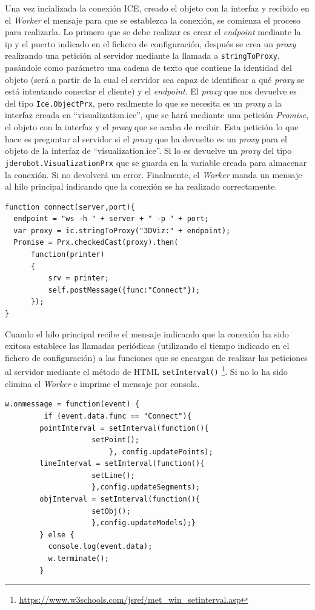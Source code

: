 Una vez incializada la conexión ICE, creado el objeto con la interfaz y recibido en el \textit{Worker} el mensaje para que se establezca la conexión, se comienza el proceso para realizarla. Lo primero que se debe realizar es crear el \textit{endpoint} mediante la ip y el puerto indicado en el fichero de configuración, después se crea un \textit{proxy} realizando una petición al servidor mediante la llamada a \texttt{stringToProxy}, pasándole como parámetro una cadena de texto que contiene la identidad del objeto (será a partir de la cual el servidor sea capaz de identificar a qué \textit{proxy} se está intentando conectar el cliente) y el \textit{endpoint}. El \textit{proxy} que nos devuelve es del tipo \texttt{Ice.ObjectPrx}, pero realmente lo que se necesita es un \textit{proxy} a la interfaz creada en ``visualization.ice'', que se hará mediante una petición \textit{Promise}, el objeto con la interfaz y el \textit{proxy} que se acaba de recibir. Esta petición lo que hace es preguntar al servidor si el \textit{proxy} que ha devuelto es un \textit{proxy} para el objeto de la interfaz de ``visualization.ice''. Si lo es devuelve un \textit{proxy} del tipo \texttt{jderobot.VisualizationPrx} que se guarda en la variable creada para almacenar la conexión. Si no devolverá un error.  Finalmente, el \textit{Worker} manda un mensaje al hilo principal indicando que la conexión se ha realizado correctamente.

\begin{lstlisting}[caption= Código para realizar la conexión ICE, label=cod.conexionice]
function connect(server,port){
  endpoint = "ws -h " + server + " -p " + port;
  var proxy = ic.stringToProxy("3DViz:" + endpoint);
  Promise = Prx.checkedCast(proxy).then(
      function(printer)
      {
          srv = printer;
          self.postMessage({func:"Connect"});
      });
}
\end{lstlisting}

Cuando el hilo principal recibe el mensaje indicando que la conexión ha sido exitosa establece las llamadas periódicas (utilizando el tiempo indicado en el fichero de configuración) a las funciones que se encargan de realizar las peticiones al servidor mediante el método de HTML \texttt{setInterval()} \footnote{\url{https://www.w3schools.com/jsref/met_win_setinterval.asp}}. Si no lo ha sido elimina el \textit{Worker} e imprime el mensaje por consola. 

\begin{lstlisting}[caption= Código para crear las llamadas periódicas a las funciones encargadas de realizar las peticiones al servidor, label=cod.funcionesinterval]
w.onmessage = function(event) {
      	 if (event.data.func == "Connect"){
		pointInterval = setInterval(function(){
					setPoint();
						}, config.updatePoints);
		lineInterval = setInterval(function(){
					setLine();
					},config.updateSegments);
		objInterval = setInterval(function(){
					setObj();
					},config.updateModels);}	
        } else {
          console.log(event.data);
          w.terminate();
        }
\end{lstlisting}

